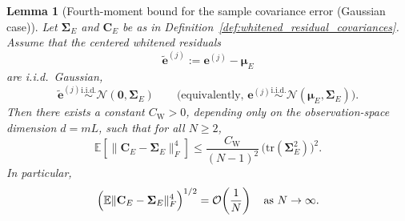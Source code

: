 \documentclass[11pt,a4paper]{article}
\newtheorem{lemma}{Lemma}
\begin{document}
\begin{lemma}[Fourth-moment bound for the sample covariance error (Gaussian case)]
\label{lem:cov_frob_fourth_moment}
Let $\boldsymbol{\Sigma}_E$ and $\mathbf{C}_E$ be as in Definition~\ref{def:whitened_residual_covariances}. Assume that the centered whitened residuals
\begin{equation}
\tilde{\mathbf{e}}^{(j)}:=\mathbf{e}^{(j)}-\boldsymbol{\mu}_E
\end{equation}
are i.i.d.\ Gaussian,
\begin{equation}
\tilde{\mathbf{e}}^{(j)} \stackrel{\mathrm{i.i.d.}}{\sim} \mathcal{N}(\mathbf{0},\boldsymbol{\Sigma}_E)
\qquad\text{(equivalently, }\mathbf{e}^{(j)} \stackrel{\mathrm{i.i.d.}}{\sim} \mathcal{N}(\boldsymbol{\mu}_E,\boldsymbol{\Sigma}_E)\text{)}.
\end{equation}
Then there exists a constant $C_{\mathrm{W}}>0$, depending only on the observation-space dimension $d=mL$, such that for all $N\ge 2$,
\begin{equation}
\label{eq:cov_fourth_moment_bound}
\mathbb{E}\!\left[\|\mathbf{C}_E-\boldsymbol{\Sigma}_E\|_F^4\right]
\le
\frac{C_{\mathrm{W}}}{(N-1)^2}\,\bigl(\mathrm{tr}(\boldsymbol{\Sigma}_E^2)\bigr)^2.
\end{equation}
In particular,
\begin{equation}
\Bigl(\mathbb{E}\|\mathbf{C}_E-\boldsymbol{\Sigma}_E\|_F^4\Bigr)^{1/2}
=
\mathcal{O}\!\left(\frac{1}{N}\right)
\quad\text{as }N\to\infty.
\end{equation}
\end{lemma}
\end{document}
